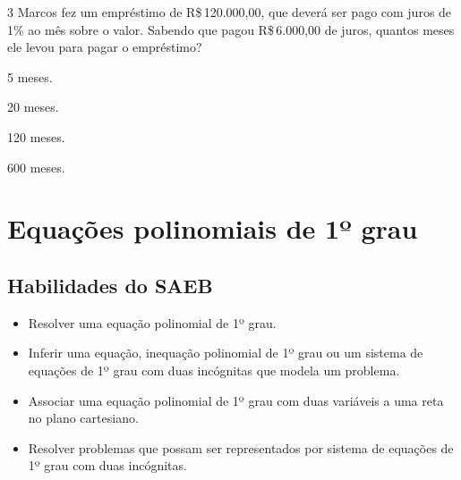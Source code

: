 \num{3} Marcos fez um empréstimo de R\$\,120.000,00, que deverá ser pago com
juros de 1\% ao mês sobre o valor. Sabendo que pagou R\$\,6.000,00 de
juros, quantos meses ele levou para pagar o empréstimo?

\begin{escolha}[itemsep=0pt]
\item 5 meses.
\item 20 meses.
\item 120 meses.
\item 600 meses.
\end{escolha}












\chapter{Equações polinomiais de 1º grau}

\section*{Habilidades do SAEB} 

\begin{itemize}
\item Resolver uma equação polinomial de 1º grau.
\item
  Inferir uma equação, inequação polinomial de 1º grau ou um sistema de
  equações de 1º grau com duas incógnitas que modela um problema.
\item
  Associar uma equação polinomial de 1º grau com duas variáveis a uma
  reta no plano cartesiano.
\item
  Resolver problemas que possam ser representados por sistema de
  equações de 1º grau com duas incógnitas.
\end{itemize}




